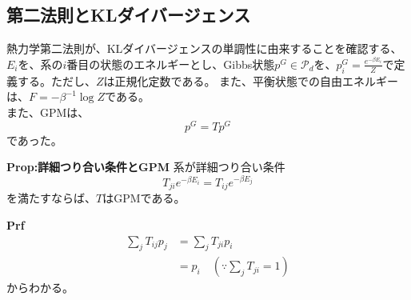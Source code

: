 \documentclass[a4paper,11pt]{jsarticle}
\numberwithin{equation}{section}
\begin{document}
\subsection{第二法則とKLダイバージェンス}
熱力学第二法則が、KLダイバージェンスの単調性に由来することを確認する、\\
$E_i$を、系の$i$番目の状態のエネルギーとし、Gibbs状態$p^G \in \mathcal{P}_d$を、$p^G_i = \frac{e^{-\beta E_i}}{Z}$で定義する。ただし、$Z$は正規化定数である。
また、平衡状態での自由エネルギーは、$F = -\beta^{-1}\log Z$である。\\
また、GPMは、
\begin{equation}
    p^G = Tp^G
\end{equation}
であった。\\
\begin{itembox}[l]{\textbf{Prop:詳細つり合い条件とGPM}}
    系が詳細つり合い条件
    \begin{equation}
        T_{ji} e^{-\beta E_i} = T_{ij} e^{-\beta E_j}
    \end{equation}
    を満たすならば、$T$はGPMである。
\end{itembox}
\textbf{Prf}\\
\begin{align}
    \sum_j T_{ij}p_j &= \sum_j T_{ji}p_i\\
    &= p_i \quad (\because \sum_j T_{ji} = 1)
\end{align}
からわかる。\hfill \qedsymbol\\
\end{document}
